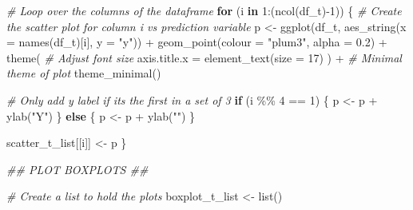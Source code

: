 \documentclass[
  11pt,
]{article}
\newenvironment{Shaded}{}{}
\newcommand{\AttributeTok}[1]{\textcolor[rgb]{0.49,0.56,0.16}{#1}}
\newcommand{\CommentTok}[1]{\textcolor[rgb]{0.38,0.63,0.69}{\textit{#1}}}
\newcommand{\ControlFlowTok}[1]{\textcolor[rgb]{0.00,0.44,0.13}{\textbf{#1}}}
\newcommand{\DecValTok}[1]{\textcolor[rgb]{0.25,0.63,0.44}{#1}}
\newcommand{\DocumentationTok}[1]{\textcolor[rgb]{0.73,0.13,0.13}{\textit{#1}}}
\newcommand{\FloatTok}[1]{\textcolor[rgb]{0.25,0.63,0.44}{#1}}
\newcommand{\FunctionTok}[1]{\textcolor[rgb]{0.02,0.16,0.49}{#1}}
\newcommand{\NormalTok}[1]{#1}
\newcommand{\OtherTok}[1]{\textcolor[rgb]{0.00,0.44,0.13}{#1}}
\newcommand{\SpecialCharTok}[1]{\textcolor[rgb]{0.25,0.44,0.63}{#1}}
\newcommand{\StringTok}[1]{\textcolor[rgb]{0.25,0.44,0.63}{#1}}
\begin{document}
\begin{Shaded}
\begin{Highlighting}[]
\CommentTok{\# Loop over the columns of the dataframe}
\ControlFlowTok{for}\NormalTok{ (i }\ControlFlowTok{in} \DecValTok{1}\SpecialCharTok{:}\NormalTok{(}\FunctionTok{ncol}\NormalTok{(df\_t)}\SpecialCharTok{{-}}\DecValTok{1}\NormalTok{)) \{}
  \CommentTok{\# Create the scatter plot for column i vs prediction variable}
\NormalTok{  p }\OtherTok{\textless{}{-}} \FunctionTok{ggplot}\NormalTok{(df\_t, }\FunctionTok{aes\_string}\NormalTok{(}\AttributeTok{x =} \FunctionTok{names}\NormalTok{(df\_t)[i], }\AttributeTok{y =} \StringTok{"y"}\NormalTok{)) }\SpecialCharTok{+}
    \FunctionTok{geom\_point}\NormalTok{(}\AttributeTok{colour =} \StringTok{"plum3"}\NormalTok{, }\AttributeTok{alpha =} \FloatTok{0.2}\NormalTok{) }\SpecialCharTok{+}
    \FunctionTok{theme}\NormalTok{(}
      \CommentTok{\# Adjust font size}
      \AttributeTok{axis.title.x =} \FunctionTok{element\_text}\NormalTok{(}\AttributeTok{size =} \DecValTok{17}\NormalTok{)}
\NormalTok{    ) }\SpecialCharTok{+}
    \CommentTok{\# Minimal theme of plot}
    \FunctionTok{theme\_minimal}\NormalTok{()}
  
  \CommentTok{\# Only add y label if it\textquotesingle{}s the first in a set of 3}
  \ControlFlowTok{if}\NormalTok{ (i }\SpecialCharTok{\%\%} \DecValTok{4} \SpecialCharTok{==} \DecValTok{1}\NormalTok{) \{}
\NormalTok{    p }\OtherTok{\textless{}{-}}\NormalTok{ p }\SpecialCharTok{+} \FunctionTok{ylab}\NormalTok{(}\StringTok{"Y"}\NormalTok{)}
\NormalTok{  \} }\ControlFlowTok{else}\NormalTok{ \{}
\NormalTok{    p }\OtherTok{\textless{}{-}}\NormalTok{ p }\SpecialCharTok{+} \FunctionTok{ylab}\NormalTok{(}\StringTok{""}\NormalTok{)}
\NormalTok{  \}}
  
\NormalTok{  scatter\_t\_list[[i]] }\OtherTok{\textless{}{-}}\NormalTok{ p}
\NormalTok{\}}


\DocumentationTok{\#\# PLOT BOXPLOTS \#\#}

\CommentTok{\# Create a list to hold the plots}
\NormalTok{boxplot\_t\_list }\OtherTok{\textless{}{-}} \FunctionTok{list}\NormalTok{()}


\end{Highlighting}
\end{Shaded}
\end{document}
